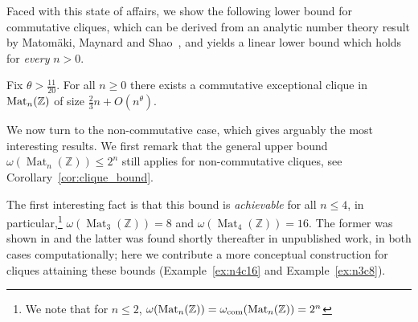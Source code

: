 \documentclass{amsart}
\theoremstyle{plain}
\newenvironment{maintheorem}[1]
  {\renewcommand\theinnermaintheorem{\ref{#1}}\innermaintheorem}
  {\endinnermaintheorem}
\theoremstyle{definition}
\DeclareMathOperator{\Mat}{Mat}
\newcommand{\Z}{\ensuremath{\mathbb{Z}}}
\newcommand{\inote}[1]{\textbf{\color{red}Ignacio: #1}}
\begin{document}





Faced with this state of affairs, we show the following lower bound for commutative cliques, which can be derived from an analytic number theory result by Matom\"aki, Maynard and Shao~\cite{Vinogradov}, and yields a linear lower bound which holds for \textit{every} $n>0$. 

\begin{maintheorem}{thm:goldbach}
Fix \(\theta > \frac{11}{20}\). For all \(n\geq 0\) there exists a commutative exceptional clique in \(\textup{Mat}_n(\Z)\) of size \(\frac{2}{3}n + O(n^{\theta})\).
\end{maintheorem}

We now turn to the non-commutative case, which gives arguably the most interesting results. We first remark that the general upper bound  $\omega(\Mat_n(\Z))\leq 2^n$ still applies for non-commutative cliques, see Corollary~\ref{cor:clique_bound}.

The first interesting fact is that this bound is \emph{achievable} for all $n\leq 4$, in particular,\footnote{We note that for $n\leq 2$,  $\omega(\Mat_n(\Z))=\omega_{\textup{com}}(\Mat_n(\Z))=2^n$ } $\omega(\Mat_3(\Z))=8$ and $\omega(\Mat_4(\Z))=16$. The former  was shown in \cite{BC24} and the latter was found shortly thereafter in unpublished work, in both cases computationally; here we contribute a more conceptual construction for cliques attaining these bounds (Example~\ref{ex:n4c16} and Example~\ref{ex:n3c8}).
\end{document}
